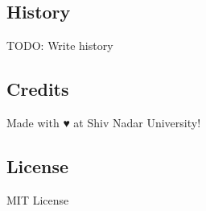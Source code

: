 \subsection*{History}

T\-O\-D\-O\-: Write history

\subsection*{Credits}

Made with ♥ at Shiv Nadar University!

\subsection*{License}

M\-I\-T License 
